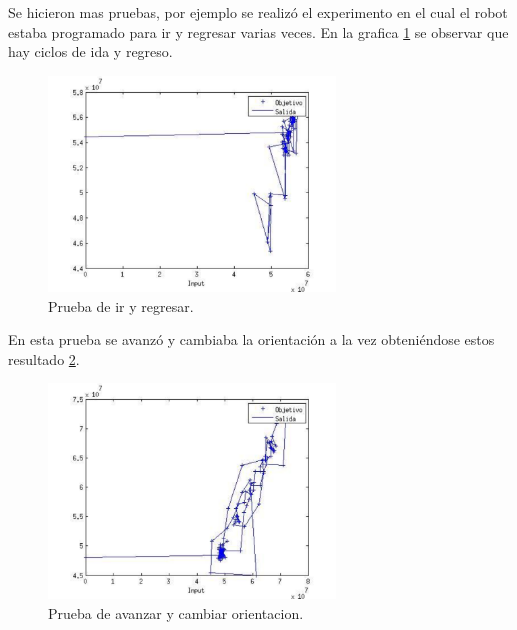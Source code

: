 Se hicieron mas pruebas, por ejemplo se realiz\'o el experimento en el cual el robot estaba programado para ir y regresar varias veces. En la grafica \ref{fig_prueba2} se observar que  hay ciclos de ida y regreso.\\
\begin{figure}
	\centering
	\includegraphics[width=3.0in]{prueba33.pdf}
	\caption{Prueba de ir y regresar.}
	\label{fig_prueba2}
\end{figure}

En esta prueba se avanz\'o y cambiaba la orientaci\'on a la vez  obteni\'endose estos resultado \ref{fig_prueba_s3}.

\begin{figure}
	\centering
	\includegraphics[width=3.0in]{prueba_3.pdf}
	\caption{Prueba de avanzar y cambiar orientacion.}
	\label{fig_prueba_s3}
\end{figure}